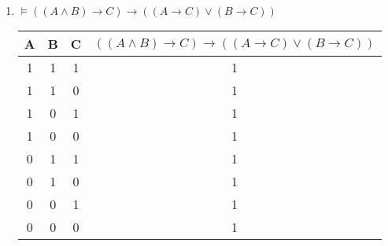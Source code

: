 \documentclass{article}
\begin{document}
\begin{enumerate}
    \item $\models ((A \wedge B) \rightarrow C) \rightarrow ((A \rightarrow C) \vee (B \rightarrow C))$
    \begin{table}[h!]
        \centering
        \begin{tabular}{|c|c|c|c|}
            \hline
            \textbf{A} & \textbf{B} & \textbf{C}  & \textbf{$((A \wedge B) \rightarrow C) \rightarrow ((A \rightarrow C) \vee (B \rightarrow C))$}\\
            \hline
            1 & 1 & 1 & 1 \\
            \hline
            1 & 1 & 0 & 1 \\
            \hline
            1 & 0 & 1 & 1 \\
            \hline
            1 & 0 & 0 & 1 \\
            \hline
            0 & 1 & 1 & 1 \\
            \hline
            0 & 1 & 0 & 1 \\
            \hline
            0 & 0 & 1 & 1 \\
            \hline
            0 & 0 & 0 & 1 \\
            \hline
        \end{tabular}
    \end{table}
\end{enumerate}
\end{document}
